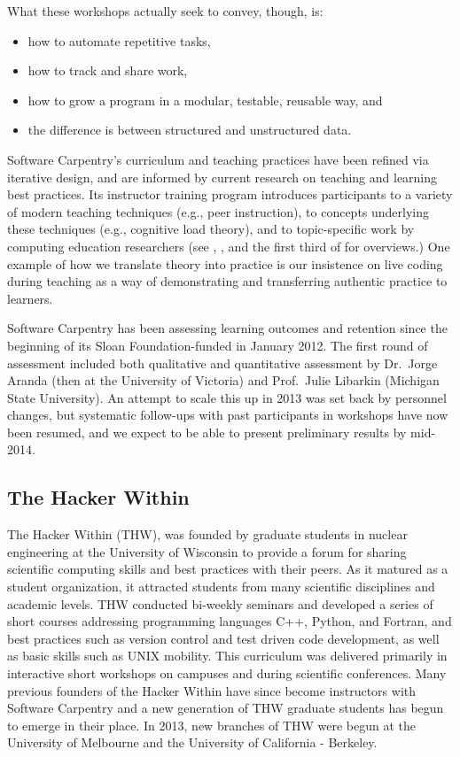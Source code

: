 \documentclass[11pt]{article}
\begin{document}
What these workshops actually seek to convey, though, is:

\begin{itemize}
\item
  how to automate repetitive tasks,
\item
  how to track and share work,
\item
  how to grow a program in a modular, testable, reusable way, and
\item
  the difference is between structured and unstructured data.
\end{itemize}

Software Carpentry's curriculum and teaching practices have been
refined via iterative design, and are informed by current research on
teaching and learning best practices.  Its instructor training program
introduces participants to a variety of modern teaching techniques
(e.g., peer instruction), to concepts underlying these techniques
(e.g., cognitive load theory), and to topic-specific work by computing
education researchers (see \cite{guzdial2010}, \cite{hazzan2011}, and
the first third of \cite{sorva2012} for overviews.)  One example of
how we translate theory into practice is our insistence on live coding
during teaching as a way of demonstrating and transferring authentic
practice to learners.

Software Carpentry has been assessing learning outcomes and retention
since the beginning of its Sloan Foundation-funded in January 2012.
The first round of assessment included both qualitative and
quantitative assessment by Dr.\ Jorge Aranda (then at the University
of Victoria) and Prof.\ Julie Libarkin (Michigan State University).
An attempt to scale this up in 2013 was set back by personnel changes,
but systematic follow-ups with past participants in workshops have now
been resumed, and we expect to be able to present preliminary results
by mid-2014.

\subsection{The Hacker Within}

The Hacker Within (THW)\cite{huff2011}, was founded by graduate students in 
nuclear engineering at the University of Wisconsin to provide a forum for 
sharing scientific computing skills and best practices with their peers. As it 
matured as a student organization, it attracted students from many scientific 
disciplines and academic levels. THW conducted bi-weekly seminars and developed 
a series of short courses addressing programming languages C++, Python, and 
Fortran, and best practices such as version control and test driven code 
development, as well as basic skills such as UNIX mobility. This curriculum was 
delivered primarily in interactive short workshops on campuses and during 
scientific conferences. Many previous founders of the Hacker Within have since 
become instructors with Software Carpentry and a new generation of THW graduate 
students has begun to emerge in their place. In 2013, new branches of THW were 
begun at the University of Melbourne and the University of California - 
Berkeley.  
\end{document}
